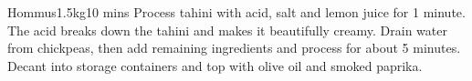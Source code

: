 \begin{recipe}{Hommus}{1.5kg}{10 mins}
Process tahini with acid, salt and lemon juice for 1 minute. The acid breaks
down the tahini and makes it beautifully creamy.
Drain water from chickpeas, then add remaining ingredients and process
for about 5 minutes. Decant into storage containers and top with olive oil
and smoked paprika.
\end{recipe}